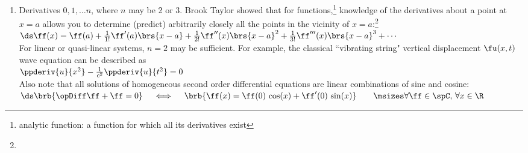 \begin{enumerate}
  \item Derivatives $0,1,\ldots n$, where $n$ may be 2 or 3.
        Brook Taylor showed that for  functions,\footnote{analytic function: a function for which all its derivatives exist}
        knowledge of the derivatives about a point at $x=a$
        allows you to determine (predict) arbitrarily closely all the points in the vicinity of $x=a$:\footnote{
        }
        \\\indentx$\ds\ff(x) = \ff(a) + \frac{1}{1!}\ff'  (a)\brs{x-a}
                                      + \frac{1}{2!}\ff'' (x)\brs{x-a}^2
                                      + \frac{1}{3!}\ff'''(x)\brs{x-a}^3
                                      + \cdots
                  $\\
        For linear or quasi-linear systems, $n=2$ may be sufficient. 
        For example, the classical ``vibrating string" vertical displacement $\fu(x,t)$ wave equation can be described as
        \\\indentx$\ppderiv{u}{x^2} - \frac{1}{c^2}\ppderiv{u}{t^2} = 0$\\
        Also note that all solutions of homogeneous second order differential equations
        are linear combinations of sine and cosine:
        \\\indentx$\ds  \brb{\opDiff\ff + \ff=0}
  \quad\iff\quad
  \brb{\ff(x) = \ff(0)\,\cos(x) + \ff^\prime(0)\,\sin(x)}
  \qquad\msizes\forall\ff\in\spC,\,\forall x\in\R
$


\end{enumerate}
